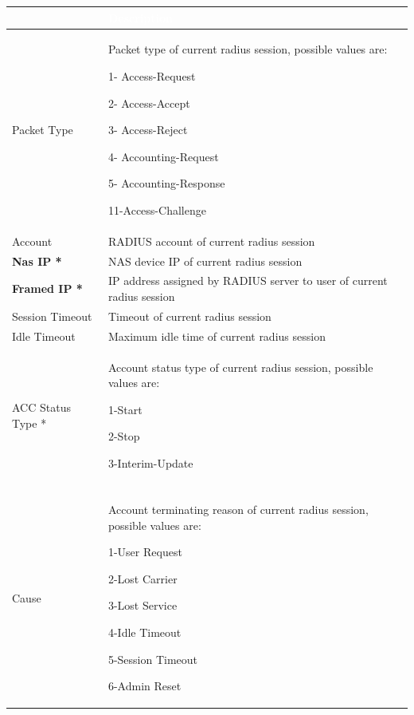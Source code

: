 \begin{longtable}{p{}|p{}}   
    \rowcolor{black}\multicolumn{1}{l!\vlinewhite}{\textcolor{white}{Field}}  & \textcolor{white}{Description} \\\hline
    Packet Type &	Packet type of current radius session, possible values are:


                    1- Access-Request


                    2- Access-Accept


                    3- Access-Reject


                    4- Accounting-Request


                    5- Accounting-Response


                    11-Access-Challenge \\\hline
    Account &	RADIUS account of current radius session \\\hline
    \textbf{Nas IP *} &	NAS device IP of current radius session \\\hline
    \textbf{Framed IP *} &	IP address assigned by RADIUS server to user of current radius session \\\hline
    Session Timeout &	Timeout of current radius session \\\hline
    Idle Timeout &	Maximum idle time of current radius session \\\hline
    ACC Status Type * &	Account status type of current radius session, possible values are:


                        1-Start


                        2-Stop


                        3-Interim-Update \\\hline
    \tabincell{l}{Acct Terminate\\ Cause} &	Account terminating reason of current radius session, possible values are:


                                            1-User Request


                                            2-Lost Carrier


                                            3-Lost Service


                                            4-Idle Timeout


                                            5-Session Timeout


                                            6-Admin Reset



\end{longtable}
